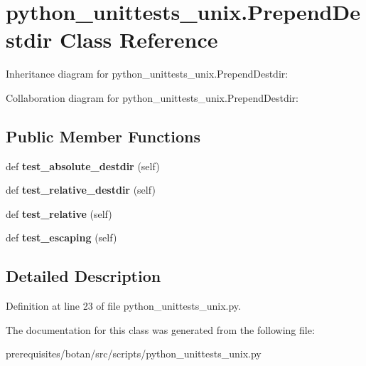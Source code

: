 \hypertarget{classpython__unittests__unix_1_1_prepend_destdir}{}\section{python\+\_\+unittests\+\_\+unix.\+Prepend\+Destdir Class Reference}
\label{classpython__unittests__unix_1_1_prepend_destdir}


Inheritance diagram for python\+\_\+unittests\+\_\+unix.\+Prepend\+Destdir\+:


Collaboration diagram for python\+\_\+unittests\+\_\+unix.\+Prepend\+Destdir\+:
\subsection*{Public Member Functions}
\begin{DoxyCompactItemize}
\item 
\mbox{\label{classpython__unittests__unix_1_1_prepend_destdir_ac480e20421c566707f1021e1e4036802}} 
def {\bfseries test\+\_\+absolute\+\_\+destdir} (self)
\item 
\mbox{\label{classpython__unittests__unix_1_1_prepend_destdir_a676d84774caa587660a2741178bb174a}} 
def {\bfseries test\+\_\+relative\+\_\+destdir} (self)
\item 
\mbox{\label{classpython__unittests__unix_1_1_prepend_destdir_afeae9953f11d3061168cd6e1fa5a0f6e}} 
def {\bfseries test\+\_\+relative} (self)
\item 
\mbox{\label{classpython__unittests__unix_1_1_prepend_destdir_a9648ce791e1cc6e0748c70d1d9be3799}} 
def {\bfseries test\+\_\+escaping} (self)
\end{DoxyCompactItemize}


\subsection{Detailed Description}


Definition at line 23 of file python\+\_\+unittests\+\_\+unix.\+py.



The documentation for this class was generated from the following file\+:\begin{DoxyCompactItemize}
\item 
prerequisites/botan/src/scripts/python\+\_\+unittests\+\_\+unix.\+py\end{DoxyCompactItemize}
